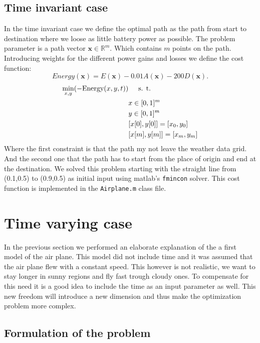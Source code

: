 \documentclass[ twoside,openright,titlepage,numbers=noenddot,headinclude,%
                footinclude=true,cleardoublepage=empty,abstractoff, %
                BCOR=5mm,paper=a4,fontsize=11pt,%
                ngerman,american,%
                ]{scrreprt}
\begin{document}
\subsection{Time invariant case}
In the time invariant case we define the optimal path as the path from start to destination where we loose as little battery power as possible. The problem parameter is a path vector $\mathbf{x} \in \mathbb{R}^m$. Which contains $m$ points on the path. Introducing weights for the different power gains and losses we define the cost function:
\begin{equation}
Energy(\mathbf{x}) = E(\mathbf{x}) -0.01A(\mathbf{x}) - 200D(\mathbf{x}).
\end{equation}
\begin{align}
       \min_{x,y}( -\text{Energy}(x,y,t)) & \hspace{5mm}  \text{s. t. } \\
		& x \in [0,1]^m\\
		& y \in [0,1]^m\\
		& [x[0],y[0]] = [x_0,y_0] \\
		& [x[m],y[m]] = [x_m,y_m] \\
\end{align}
Where the first constraint is that the path my not leave the weather data grid. And the second one that the path has to start from the place of origin and end at the destination. We solved this problem starting with the straight line from (0.1,0.5) to (0.9,0.5) as initial input using matlab's \texttt{fmincon} solver. This cost function is implemented in the \texttt{Airplane.m} class file.


\section{Time varying case}

In the previous section we performed an elaborate explanation of the a first model of the air plane.
This model did not include time  and it was assumed that the air plane flew with a constant speed.
This however is not realistic, we want to stay longer in sunny regions and fly fast trough cloudy ones.
To compensate for this need it is a good idea to include the time as an input parameter as well.
This new freedom will introduce a new dimension and thus make the optimization problem more complex.

\subsection{Formulation of the problem}
\end{document}

